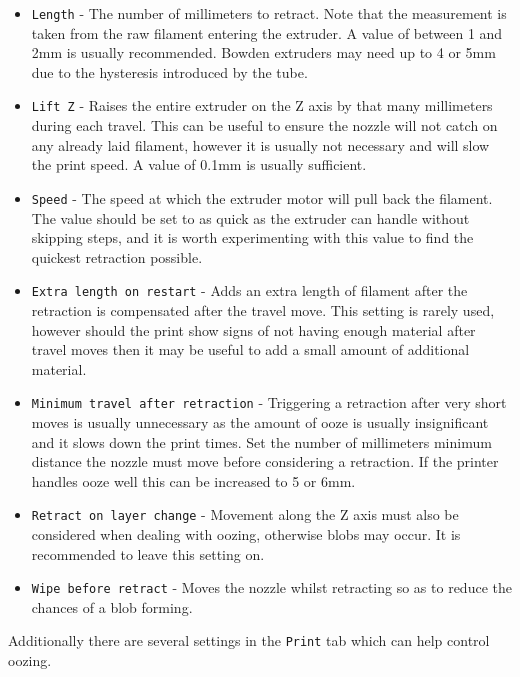\begin{itemize}
    \item \texttt{Length} - The number of millimeters to retract.  Note that the measurement is taken from the raw filament entering the extruder.  A value of between 1 and 2mm is usually recommended. Bowden extruders may need up to 4 or 5mm due to the hysteresis introduced by the tube.
    \item \texttt{Lift Z} - Raises the entire extruder on the Z axis by that many millimeters during each travel.  This can be useful to ensure the nozzle will not catch on any already laid filament, however it is usually not necessary and will slow the print speed.  A value of 0.1mm is usually sufficient.
    \item \texttt{Speed} - The speed at which the extruder motor will pull back the filament.  The value should be set to as quick as the extruder can handle without skipping steps, and it is worth experimenting with this value to find the quickest retraction possible.
    \item \texttt{Extra length on restart} -  Adds an extra length of filament after the retraction is compensated after the travel move. This setting is rarely used, however should the print show signs of not having enough material after travel moves then it may be useful to add a small amount of additional material.
    \item \texttt{Minimum travel after retraction} - Triggering a retraction after very short moves is usually unnecessary as the amount of ooze is usually insignificant and it slows down the print times.  Set the number of millimeters minimum distance the nozzle must move before considering a retraction.  If the printer handles ooze well this can be increased to 5 or 6mm.
    \item \texttt{Retract on layer change} - Movement along the Z axis must also be considered when dealing with oozing, otherwise blobs may occur.  It is recommended to leave this setting on.
    \item \texttt{Wipe before retract} - Moves the nozzle whilst retracting so as to reduce the chances of a blob forming.
\end{itemize}


Additionally there are several settings in the \texttt{Print} tab which can help control oozing.

